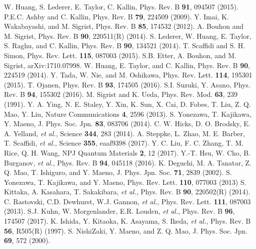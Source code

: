 \documentclass[aps,prl,twocolumn,superscriptaddress,showpacs]{revtex4-1}
\begin{document}
\begin{thebibliography}{99}
 W. Huang, S. Lederer, E. Taylor, C. Kallin, Phys. Rev. B {\bf 91}, 094507 (2015).
 P.E.C. Ashby and C. Kallin, Phys. Rev. B {\bf 79}, 224509 (2009).
 Y. Imai, K. Wakabayashi, and M. Sigrist, Phys. Rev. B {\bf 85}, 174532 (2012).
 A. Bouhon and M. Sigrist, Phys. Rev. B {\bf 90}, 220511(R) (2014).
 S. Lederer, W. Huang, E. Taylor, S. Raghu, and C. Kallin, Phys. Rev. B {\bf 90}, 134521 (2014).
 T. Scaffidi and S. H. Simon, Phys. Rev. Lett. {\bf 115}, 087003 (2015).
 S.B. Etter, A. Bouhon, and M. Sigrist, arXiv:1710.07998.
 W. Huang, E. Taylor, and C. Kallin, Phys. Rev. B {\bf 90}, 224519 (2014).
 Y. Tada, W. Nie, and M. Oshikawa, Phys. Rev. Lett. {\bf 114}, 195301 (2015).
 T. Ojanen, Phys. Rev. B {\bf 93}, 174505 (2016).
 S.I. Suzuki, Y. Asano, Phys. Rev. B {\bf 94}, 155302 (2016).
 M. Sigrist and K. Ueda, Phys. Rev. Mod. {\bf 63}, 239 (1991).
 Y. A. Ying, N. E. Staley, Y. Xin, K. Sun, X. Cai, D. Fobes, T. Liu, Z. Q. Mao, Y. Liu, Nature Communications {\bf 4}, 2596 (2013).
 S. Yonezawa, T. Kajikawa, Y. Maeno, J. Phys. Soc. Jpn. {\bf 83}, 083706 (2014).
 C. W. Hicks, D. O. Brodsky, E. A. Yelland, {\it et al.}, Science {\bf 344}, 283 (2014).
 A. Steppke, L. Zhao, M. E. Barber, T. Scaffidi, {\it et al.}, Science {\bf 355}, eaaf9398 (2017).
 Y. C. Liu, F. C. Zhang, T. M. Rice, Q. H. Wang, NPJ Quantum Materials {\bf 2}, 12 (2017).
 Y.-T. Hsu, W. Cho, B. Burganov, {\it et al.}, Phys. Rev. B {\bf 94}, 045118 (2016).
 K. Deguchi, M. A. Tanatar, Z. Q. Mao, T. Ishiguro, and Y. Maeno, J. Phys. Jpn. Soc. {\bf 71}, 2839 (2002).
 S. Yonezawa, T. Kajikawa, and Y. Maeno, Phys. Rev. Lett. {\bf 110}, 077003 (2013)
 S. Kittaka, A. Kasahara, T. Sakakibara, {\it et al.}, Phys. Rev. B {\bf 90}, 220502(R) (2014).
 C. Rastovski, C.D. Dewhurst, W.J. Gannon, {\it et al.}, Phys. Rev. Lett. {\bf 111}, 087003 (2013).
 S.J. Kuhn, W. Morgenlander, E.R. Louden, {\it et al.}, Phys. Rev. B {\bf 96}, 174507 (2017).
 K. Ishida, Y. Kitaoka, K. Asayama, S. Ikeda, {\it et al.}, Phys. Rev. B {\bf 56}, R505(R) (1997).
 S. NishiZaki, Y. Maeno, and Z. Q. Mao, J. Phys. Soc. Jpn. {\bf 69}, 572 (2000).

\end{thebibliography}
\end{document}
